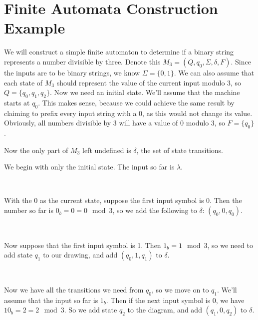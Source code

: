 \documentclass{bcthesis}
\newenvironment{exstep}[1]
		{
			\begin{minipage}{0.5 \textwidth}
				#1
			\end{minipage} \begin{minipage}{0.5 \paperwidth}
		}
		{
			\end{minipage}\\[0.5 em]
		}
\begin{document}
	\section{Finite Automata Construction Example} %
	\label{sec:finite_automata_construction_example}
		We will construct a simple finite automaton to determine if a binary string represents a number divisible by three.
		Denote this $M_3 = (Q, q_0, \Sigma, \delta, F)$.
		Since the inputs are to be binary strings, we know $\Sigma = \{ 0, 1 \}$.
		We can also assume that each state of $M_3$ should represent the value of the current input modulo 3, so $Q = \{q_0, q_1, q_2\}$.
		Now we need an initial state. 
		We'll assume that the machine starts at $q_0$. 
		This makes sense, because we could achieve the same result by claiming to prefix every input string with a 0, as this would not change its value.
		Obviously, all numbers divisible by 3 will have a value of 0 modulo 3, so $F = \{q_0\}$.

		Now the only part of $M_3$ left undefined is $\delta$, the set of state transitions.

			\begin{exstep}
				{
					We begin with only the initial state.
					The input so far is $\lambda$.
				}
				
			\end{exstep}

			\begin{exstep}
				{
					With the 0 as the current state, suppose the first input symbol is 0. 
					Then the number so far is $0_b = 0 = 0 \mod 3$, so we add the following to $\delta$: $(q_0, 0, q_0)$.
				}
				
			\end{exstep}

			\begin{exstep}
				{
					Now suppose that the first input symbol is 1. 
					Then $1_b = 1 \mod 3$, so we need to add state $q_1$ to our drawing, and add $(q_0, 1, q_1)$ to $\delta$.
				}
				
			\end{exstep}

			\begin{exstep}
				{
					Now we have all the transitions we need from $q_0$, so we move on to $q_1$.
					We'll assume that the input so far is $1_b$.
					Then if the next input symbol is $0$, we have $10_b = 2 = 2 \mod 3$.
					So we add state $q_2$ to the diagram, and add $(q_1, 0, q_2)$ to $\delta$.
				}
				
			\end{exstep}
\end{document}
